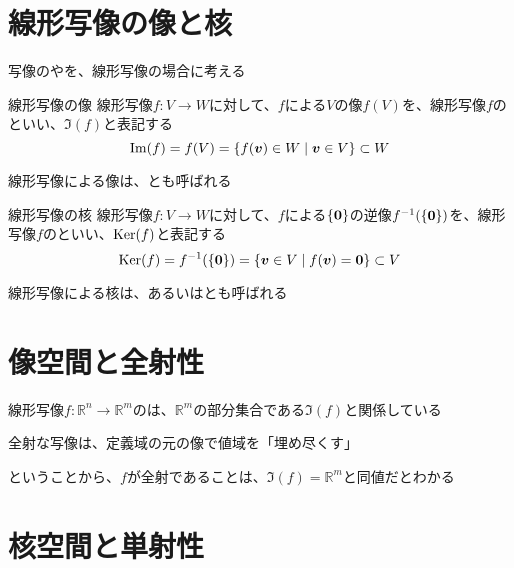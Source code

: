 \documentclass[../../../topic_linear-algebra]{subfiles}
\begin{document}
\sectionline
\section{線形写像の像と核}

写像のやを、線形写像の場合に考える

\begin{definition}{線形写像の像}
  線形写像$f\colon V \to W$に対して、$f$による$V$の像$f(V)$を、線形写像$f$のといい、$\Im(f)$と表記する
  \begin{equation*}
    \Im(f) = f(V) = \{ f(\vb*{v}) \in W \mid \vb*{v} \in V \} \subset W
  \end{equation*}
\end{definition}

線形写像による像は、とも呼ばれる

\br

\begin{definition}{線形写像の核}
  線形写像$f\colon V \to W$に対して、$f$による$\{\vb*{0}\}$の逆像$f^{-1}(\{\vb*{0}\})$を、線形写像$f$のといい、$\operatorname{Ker}(f)$と表記する
  \begin{equation*}
    \operatorname{Ker}(f) = f^{-1}(\{\vb*{0}\}) = \{ \vb*{v} \in V \mid f(\vb*{v}) = \vb*{0} \} \subset V
  \end{equation*}
\end{definition}

線形写像による核は、あるいはとも呼ばれる

\sectionline
\section{像空間と全射性}\label{sec:image-and-surjectivity}

線形写像$f\colon \mathbb{R}^n \to \mathbb{R}^m$のは、$\mathbb{R}^m$の部分集合である$\Im(f)$と関係している

\begin{shaded}
  全射な写像は、定義域の元の像で値域を「埋め尽くす」
\end{shaded}

ということから、$f$が全射であることは、$\Im(f) = \mathbb{R}^m$と同値だとわかる

\sectionline
\section{核空間と単射性}
\end{document}

